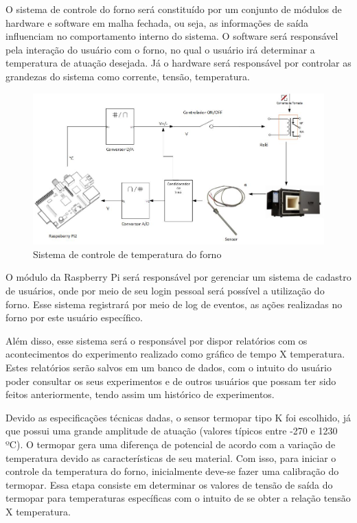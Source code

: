 O sistema de controle do forno será constituído por um conjunto de módulos de hardware e software em malha fechada, ou seja, as informações de saída influenciam no comportamento interno do sistema. O software será responsável pela interação do usuário com o forno, no qual o usuário irá determinar a temperatura de atuação desejada. Já o hardware será responsável por controlar as grandezas do sistema como corrente, tensão, temperatura.

\begin{figure}[h]
	\centering
	\label{diagrama}
	\includegraphics[keepaspectratio=true,scale=0.5]{figuras/diagrama.jpg}
	\caption{Sistema de controle de temperatura do forno}
\end{figure}

O módulo da Raspberry Pi será responsável por gerenciar um sistema de cadastro de usuários, onde por meio de seu login pessoal será possível a utilização do forno. Esse sistema registrará por meio de log de eventos, as ações realizadas no forno por este usuário específico.

Além disso, esse sistema será o responsável por dispor relatórios com os acontecimentos do experimento realizado como gráfico de tempo X temperatura. Estes relatórios serão salvos em um banco de dados, com o intuito do usuário poder consultar os seus experimentos e de outros usuários que possam ter sido feitos anteriormente, tendo assim um histórico de experimentos.

Devido as especificações técnicas dadas, o sensor termopar tipo K foi escolhido, já que possui uma grande amplitude de atuação (valores típicos entre -270 e 1230 ºC). O termopar gera uma diferença de potencial de acordo com a variação de temperatura devido as características de seu material. Com isso, para iniciar o controle da temperatura do forno, inicialmente deve-se fazer uma calibração do termopar. Essa etapa consiste em determinar os valores de tensão de saída do termopar para temperaturas específicas com o intuito de se obter a relação tensão X temperatura.

